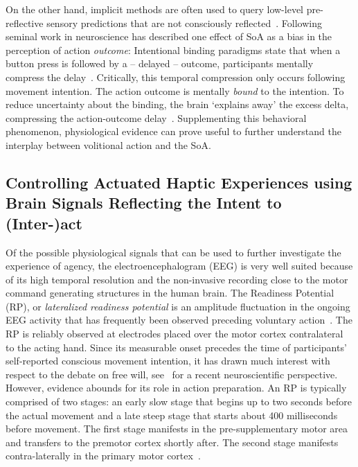 On the other hand, implicit methods are often used to query low-level pre-reflective sensory predictions that are not consciously reflected~\cite{Moore2016-ub, Limerick2014-un, Moore2012-ic}. Following seminal work in neuroscience has described one effect of SoA as a bias in the perception of action \textit{outcome}: Intentional binding paradigms state that when a button press is followed by a -- delayed -- outcome, participants mentally compress the delay~\cite{Haggard2002-sz}. Critically, this temporal compression only occurs following movement intention. The action outcome is mentally \textit{bound} to the intention. To reduce uncertainty about the binding, the brain `explains away' the excess delta, compressing the action-outcome delay~\cite{Barlas2018-bq}. Supplementing this behavioral phenomenon, physiological evidence can prove useful to further understand the interplay between volitional action and the SoA.

\subsection{Controlling Actuated Haptic Experiences using Brain Signals Reflecting the Intent to (Inter-)act}
Of the possible physiological signals that can be used to further investigate the experience of agency, the electroencephalogram (EEG) is very well suited because of its high temporal resolution and the non-invasive recording close to the motor command generating structures in the human brain. The Readiness Potential (RP), or \textit{lateralized readiness potential} is an amplitude fluctuation in the ongoing EEG activity that has frequently been observed preceding voluntary action~\cite{Deecke1969-bl, Libet1983-qu}. The RP is reliably observed at electrodes placed over the motor cortex contralateral to the acting hand. Since its measurable onset precedes the time of participants' self-reported conscious movement intention, it has drawn much interest with respect to the debate on free will, see~\cite{Schurger2021-vp} for a recent neuroscientific perspective. However, evidence abounds for its role in action preparation. An RP is typically comprised of two stages: an early slow stage that begins up to two seconds before the actual movement and a late steep stage that starts about 400 milliseconds before movement. The first stage manifests in the pre-supplementary motor area and transfers to the premotor cortex shortly after. The second stage manifests contra-laterally in the primary motor cortex~\cite{Shibasaki2006-mt}. 

